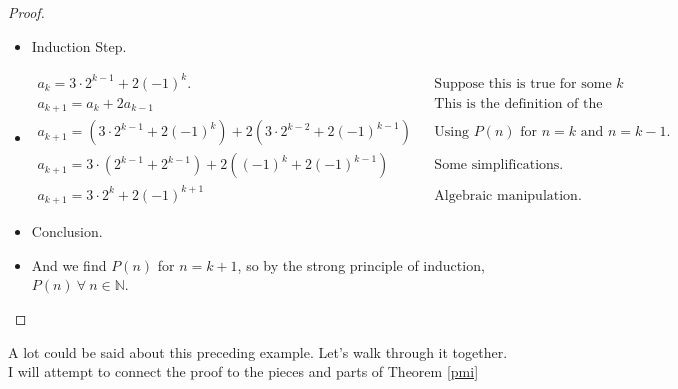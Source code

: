 \begin{example}[$a_1 =1, a_2 = 8 \land a_n = a_{n-1} + 2a_{n-2}, ~\forall ~n>3$]
\begin{proof}
\begin{itemize}
\item Induction Step.

\item[]\begin{align*}
 a_k = 3\cdot 2^{k-1} + 2(-1)^k.					& &\textrm{Suppose this is true for some $k$}\\
a_{k+1} = a_k + 2a_{k-1}												& &\textrm{This is the definition of the recurrence.}\\
a_{k+1} = \left( 3\cdot 2^{k-1} + 2(-1)^k\right)+2\left(3\cdot 2^{k-2} + 2(-1)^{k-1}\right) & & \textrm{Using $P(n)$ for $n=k$ and $n=k-1.$}\\
a_{k+1} = 3\cdot\left( 2^{k-1} +  2^{k-1} \right)+2\left( (-1)^k + 2(-1)^{k-1}\right) & & \textrm{Some simplifications.}\\
a_{k+1} = 3\cdot 2^{k}+2(-1)^{k+1} & & \textrm{Algebraic manipulation.}
\end{align*}

\item Conclusion. 
\item [] And we find  $P(n)$ for $n = k+1$, so by the strong principle of induction, $P(n) ~\forall ~n\in\mathbb{N}$.
\end{itemize}
\end{proof}
\end{example}
A lot could be said about this preceding example.  Let's walk through it together.  I will attempt to connect the proof to the pieces and parts of Theorem \ref{pmi}
